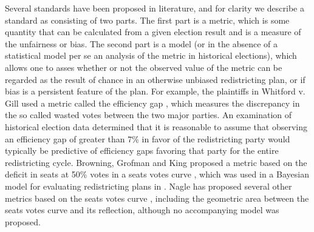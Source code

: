 \documentclass[preprint,12pt]{article}
\begin{document}
Several standards have been proposed in literature, and for clarity we describe a standard as consisting of two parts.
The first part is a metric, which is some quantity that can be calculated from a given election result and is a measure of the unfairness or bias.
The second part is a model (or in the absence of a statistical model per se an analysis of the metric in historical elections), which allows one to asses whether or not the observed value of the metric can be regarded as the result of chance in an otherwise unbiased redistricting plan, or if bias is a persistent feature of the plan.
For example, the plaintiffs in Whitford v. Gill used a metric called the efficiency gap \cite{Stephanopoulos_2014_}, which measures the discrepancy in the so called wasted votes between the two major parties.
An examination of historical election data determined that it is reasonable to assume that observing an efficiency gap of greater than 7\% in favor of the redistricting party would typically be predictive of efficiency gaps favoring that party for the entire redistricting cycle.
Browning, Grofman and King proposed a metric based on the deficit in seats at 50\% votes in a seats votes curve \cite{Browning_1987_,Grofman_2008_}, which was used in a Bayesian model for evaluating redistricting plans in \cite{Gelman_1994_,Gelman_1994_a}.
Nagle has proposed several other metrics based on the seats votes curve \cite{Nagle_2015_10.1089/elj.2015.0311}, including the geometric area between the seats votes curve and its reflection, although no accompanying model was proposed.
\end{document}
